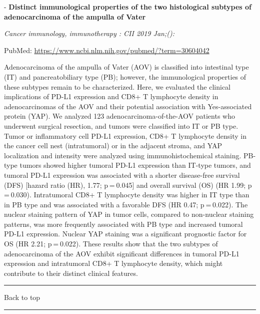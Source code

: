 \documentclass[]{article}
\begin{document}
 - \textbf{Distinct immunological properties of the two histological
subtypes of adenocarcinoma of the ampulla of Vater}

\emph{Cancer immunology, immunotherapy : CII 2019 Jan;():}

PubMed: \url{https://www.ncbi.nlm.nih.gov/pubmed/?term=30604042}

Adenocarcinoma of the ampulla of Vater (AOV) is classified into
intestinal type (IT) and pancreatobiliary type (PB); however, the
immunological properties of these subtypes remain to be characterized.
Here, we evaluated the clinical implications of PD-L1 expression and
CD8+ T lymphocyte density in adenocarcinomas of the AOV and their
potential association with Yes-associated protein (YAP). We analyzed 123
adenocarcinoma-of-the-AOV patients who underwent surgical resection, and
tumors were classified into IT or PB type. Tumor or inflammatory cell
PD-L1 expression, CD8+ T lymphocyte density in the cancer cell nest
(intratumoral) or in the adjacent stroma, and YAP localization and
intensity were analyzed using immunohistochemical staining. PB-type
tumors showed higher tumoral PD-L1 expression than IT-type tumors, and
tumoral PD-L1 expression was associated with a shorter disease-free
survival (DFS) {[}hazard ratio (HR), 1.77; p = 0.045{]} and overall
survival (OS) (HR 1.99; p = 0.030). Intratumoral CD8+ T lymphocyte
density was higher in IT type than in PB type and was associated with a
favorable DFS (HR 0.47; p = 0.022). The nuclear staining pattern of YAP
in tumor cells, compared to non-nuclear staining patterns, was more
frequently associated with PB type and increased tumoral PD-L1
expression. Nuclear YAP staining was a significant prognostic factor for
OS (HR 2.21; p = 0.022). These results show that the two subtypes of
adenocarcinoma of the AOV exhibit significant differences in tumoral
PD-L1 expression and intratumoral CD8+ T lymphocyte density, which might
contribute to their distinct clinical features.

{}

{}

\begin{center}\rule{0.5\linewidth}{\linethickness}\end{center}

Back to top

\begin{center}\rule{0.5\linewidth}{\linethickness}\end{center}

\pagebreak
\end{document}
